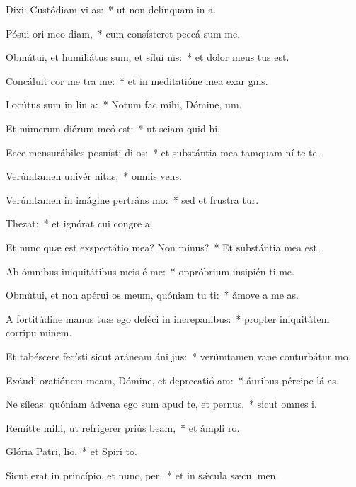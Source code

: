 \item Dixi: Custódiam vi as:~* ut non delínquam in  a.
\item Pósui ori meo diam,~* cum consísteret peccá sum me.
\item Obmútui, et humiliátus sum, et sílui  nis:~* et dolor meus tus est.
\item Concáluit cor me tra me:~* et in meditatióne mea exar gnis.
\item Locútus sum in lin a:~* Notum fac mihi, Dómine,  um.
\item Et númerum diérum meó  est:~* ut sciam quid  hi.
\item Ecce mensurábiles posuísti di os:~* et substántia mea tamquam ní te te.
\item Verúmtamen univér nitas,~* omnis  vens.
\item Verúmtamen in imágine pertráns mo:~* sed et frustra tur.
\item Thezat:~* et ignórat cui congre a.
\item Et nunc quæ est exspectátio mea? Non minus?~* Et substántia mea   est.
\item Ab ómnibus iniquitátibus meis é me:~* oppróbrium insipién ti me.
\item Obmútui, et non apérui os meum, quóniam tu ti:~* ámove a me  as.
\item A fortitúdine manus tuæ ego deféci in increpanibus:~* propter iniquitátem corripu minem.
\item Et tabéscere fecísti sicut aráneam áni jus:~* verúmtamen vane conturbátur  mo.
\item Exáudi oratiónem meam, Dómine, et deprecatió am:~* áuribus pércipe lá as.
\item Ne síleas: quóniam ádvena ego sum apud te, et pernus,~* sicut omnes  i.
\item Remítte mihi, ut refrígerer priús beam,~* et ámpli  ro.
\item Glória Patri,  lio,~* et Spirí to.
\item Sicut erat in princípio, et nunc,  per,~* et in sǽcula sæcu. men.
